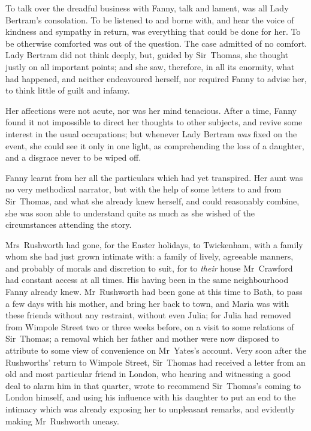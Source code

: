 To talk over the dreadful business with Fanny, talk and lament, was all Lady Bertram's consolation. To be listened to and borne with, and hear the voice of kindness and sympathy in return, was everything that could be done for her. To be otherwise comforted was out of the question. The case admitted of no comfort. Lady Bertram did not think deeply, but, guided by Sir~Thomas, she thought justly on all important points; and she saw, therefore, in all its enormity, what had happened, and neither endeavoured herself, nor required Fanny to advise her, to think little of guilt and infamy.

Her affections were not acute, nor was her mind tenacious. After a time, Fanny found it not impossible to direct her thoughts to other subjects, and revive some interest in the usual occupations; but whenever Lady Bertram \textit{was}  fixed on the event, she could see it only in one light, as comprehending the loss of a daughter, and a disgrace never to be wiped off.

Fanny learnt from her all the particulars which had yet transpired. Her aunt was no very methodical narrator, but with the help of some letters to and from Sir~Thomas, and what she already knew herself, and could reasonably combine, she was soon able to understand quite as much as she wished of the circumstances attending the story.

Mrs~Rushworth had gone, for the Easter holidays, to Twickenham, with a family whom she had just grown intimate with: a family of lively, agreeable manners, and probably of morals and discretion to suit, for to \textit{their}  house Mr~Crawford had constant access at all times. His having been in the same neighbourhood Fanny already knew. Mr~Rushworth had been gone at this time to Bath, to pass a few days with his mother, and bring her back to town, and Maria was with these friends without any restraint, without even Julia; for Julia had removed from Wimpole Street two or three weeks before, on a visit to some relations of Sir~Thomas; a removal which her father and mother were now disposed to attribute to some view of convenience on Mr~Yates's account. Very soon after the Rushworths' return to Wimpole Street, Sir~Thomas had received a letter from an old and most particular friend in London, who hearing and witnessing a good deal to alarm him in that quarter, wrote to recommend Sir~Thomas's coming to London himself, and using his influence with his daughter to put an end to the intimacy which was already exposing her to unpleasant remarks, and evidently making Mr~Rushworth uneasy.

